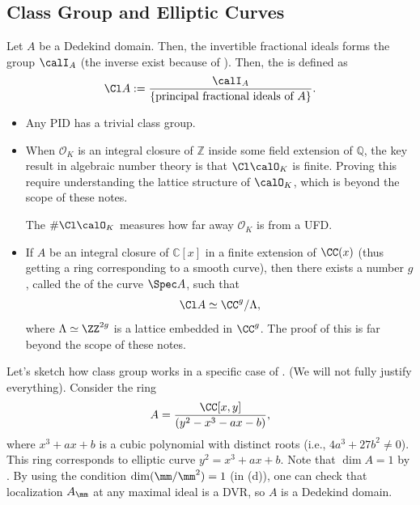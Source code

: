 \subsection{Class Group and Elliptic Curves}
\begin{definition}
    Let $A$ be a Dedekind domain. Then, the invertible
    fractional ideals forms the group $\calI_A$
    (the inverse exist because of ).
    Then, the  is defined as
    $$\Cl A := \frac{\calI_A}{\{\text{principal fractional
    ideals of } A\}}.$$
\end{definition}
\begin{example}
\begin{itemize}
\item Any PID has a trivial class group.
\item When $\mathcal O_K$ is an integral closure of $\mathbb Z$
inside some field extension of $\mathbb Q$,
the key result in algebraic number theory 
is that $\Cl\calO_K$ is finite.
Proving this require understanding the lattice
structure of $\calO_K$, which is beyond the scope
of these notes.

The  $\#\Cl\calO_K$ measures
how far away $\mathcal O_K$ is from a UFD.
\item If $A$ be an integral closure of $\mathbb C[x]$
in a finite extension of $\CC(x)$
(thus getting a ring corresponding to a smooth curve),
then there exists a number $g$, called the 
 of the curve $\Spec A$, such that
$$\Cl A \simeq \CC^g/\Lambda,$$
where $\Lambda\simeq\ZZ^{2g}$ is a lattice
embedded in $\CC^{g}$.
The proof of this is far beyond the scope of these notes.
\end{itemize}
\end{example}

Let's sketch how class group works in a specific case
of . 
(We will not fully justify everything).
Consider the ring
$$A = \frac{\CC[x,y]}{(y^2-x^3-ax-b)},$$
where  $x^3+ax+b$ is a cubic polynomial with distinct roots
(i.e., $4a^3 + 27b^2\neq 0$).
This ring corresponds to elliptic curve $y^2=x^3+ax+b$.
Note that $\dim A=1$ by .
By using the condition $\dim(\mm/\mm^2)=1$
(in  (d)), one can check that localization
$A_\mm$ at any maximal ideal is a DVR, so $A$ is a Dedekind domain.

